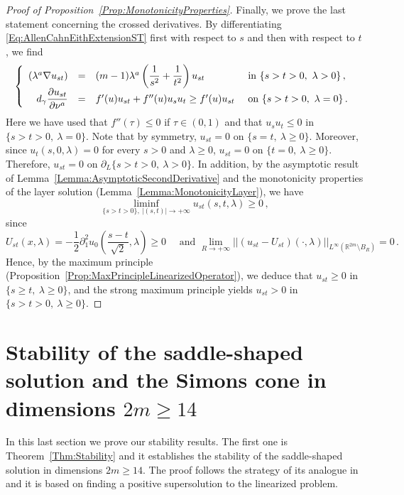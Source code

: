 \documentclass[12pt,reqno]{amsart}
\theoremstyle{definition}
\theoremstyle{remark}
\newcommand{\con}[1]{\mathbb{#1}}
\newcommand{\R}{\con{R}} %
\newcommand{\norm}[1]{\left | \left |{#1} \right | \right |}
\newcommand{\s}{\gamma}
\newcommand{\bpar}[1]{\left ( {#1}\right )}
\newcommand\beqc[1]{\left\{\begin{array}{#1}}
\newcommand\eeqc{\end{array} \right.}
\def\PDEsystem{rcll}
\let\div\relax
\DeclareMathOperator{\div}{div}
\numberwithin{equation}{section}
\begin{document}
\begin{proof}[Proof of Proposition~\ref{Prop:MonotonicityProperties}]
Finally, we prove the last statement concerning the crossed derivatives. By differentiating \eqref{Eq:AllenCahnEithExtensionST} first with respect to $s$ and then with respect to $t$, we find
$$
\beqc{\PDEsystem}
\div (\lambda^a \nabla u_{st}) & = & (m-1)\lambda^a \bpar{\dfrac{1}{s^2} + \dfrac{1}{t^2} } u_{st} & \text{ in } \{ s > t > 0 ,\ \lambda > 0\}\,, \\
d_\s \dfrac{\partial u_{st}}{\partial \nu^a}& = & f'(u)u_{st} + f''(u)u_s u_t \geq  f'(u)u_{st}& \text{ on }  \{ s > t > 0 , \ \lambda = 0\}\,.
\eeqc
$$
Here we have used that $f''(\tau) \leq 0$ if $\tau \in (0,1)$ and that $u_s u_t \leq 0$ in  $\{ s > t > 0 , \ \lambda = 0\}$. Note that by symmetry, $u_{st}= 0$ on $\{s=t, \ \lambda \geq 0 \}$. Moreover, since $u_t(s,0,\lambda) = 0$ for every $s > 0$ and $\lambda \geq 0$, $u_{st}= 0$ on $\{t=0, \ \lambda \geq 0 \}$. Therefore, $u_{st}= 0$ on $\partial_L \{ s > t > 0 ,\ \lambda > 0\}$. In addition, by the asymptotic result of Lemma~\ref{Lemma:AsymptoticSecondDerivative} and the monotonicity properties of the layer solution (Lemma~\ref{Lemma:MonotonicityLayer}), we have
$$
\liminf_{\{s> t>0\} ,\ |(s,t)|\to +\infty}  u_{st}(s,t,\lambda) \geq 0\,,
$$
since
$$
U_{st} (x,\lambda) = -\dfrac{1}{2} \partial_1^2 u_0\bpar{\dfrac{s-t}{\sqrt{2}}, \lambda} \geq 0 \quad \text{ and } \lim_{R\to +\infty} \norm{(u_{st} - U_{st})(\cdot,\lambda) }_{L^\infty(\R^{2m}\setminus B_{R})} = 0\,.
$$
Hence, by the maximum principle (Proposition~\ref{Prop:MaxPrincipleLinearizedOperator}), we deduce that $u_{st} \geq 0$ in $\{ s \geq t,\ \lambda \geq 0\}$, and the strong maximum principle yields $u_{st} > 0$ in $\{ s > t > 0,\ \lambda \geq 0\}$.
\end{proof}


\section{Stability of the saddle-shaped solution and the Simons cone in dimensions $2m\geq 14$}
\label{Sec:Stability}

In this last section we prove our stability results. The first one is Theorem~\ref{Thm:Stability} and it establishes the stability of the saddle-shaped solution in dimensions $2m\geq 14$. The proof follows the strategy of its analogue in \cite{Cabre-Saddle} and it is based on finding a positive supersolution to the linearized problem. 
\end{document}
